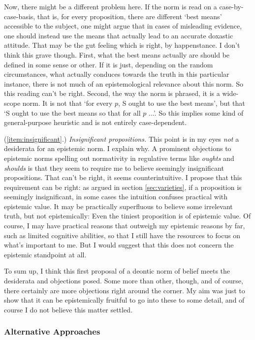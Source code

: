 \documentclass[12pt,numbers=noenddot]{scrartcl}
\begin{document}
Now, there might be a different problem here. If the norm is read on a case-by-case-basis, that is, for every proposition, there are different ‘best means’ accessible to the subject, one might argue that in cases of misleading evidence, one should instead use the means that actually lead to an accurate doxastic attitude. That may be the gut feeling which is right, by happenstance. I don't think this grave though. First, what the best means actually are should be defined in some sense or other. If it is just, depending on the random circumstances, what actually conduces towards the truth in this particular instance, there is not much of an epistemological relevance about this norm. So this reading can't be right. Second, the way the norm is phrased, it is a wide-scope norm. It is not that ‘for every $p$, S ought to use the best means’, but that ‘S ought to use the best means so that for all $p$ ...’. So this implies some kind of general-purpose heuristic and is not entirely case-dependent.

(\ref{item:insignificant}.) \emph{Insignificant propositions.}
This point is in my eyes \emph{not} a desiderata for an epistemic norm. I explain why. A prominent objections to epistemic norms spelling out normativity in regulative terms like \emph{oughts} and \emph{shoulds} is that they seem to require me to believe seemingly insignificant propositions. That can't be right, it seems counterintuitive. I propose that this requirement can be right: as argued in section \ref{sec:varieties}, if a proposition is seemingly insignificant, in some cases the intuition confuses practical with epistemic value. It may be practically superfluous to believe some irrelevant truth, but not epistemically: Even the tiniest proposition is of epistemic value. Of course, I may have practical reasons that outweigh my epistemic reasons by far, such as limited cognitive abilities, so that I still have the resources to focus on what's important to me. But I would suggest that this does not concern the epistemic standpoint at all.

To sum up, I think this first proposal of a deontic norm of belief meets the desiderata and objections posed. Some more than other, though, and of course, there certainly are more objections right around the corner. My aim was just to show that it can be epistemically fruitful to go into these to some detail, and of course I do not believe this matter settled.

\subsubsection{Alternative Approaches}
\end{document}
